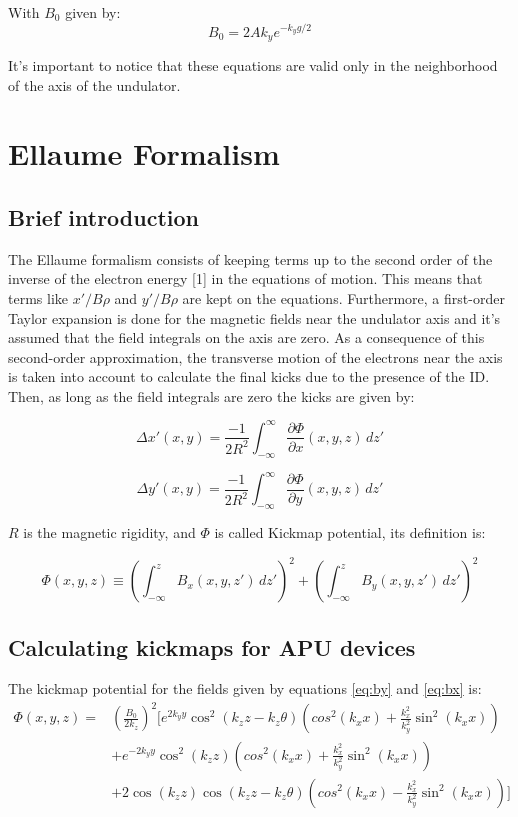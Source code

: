 \documentclass{article}
\begin{document}
With $B_0$ given by:
\begin{equation}
B_0 = 2Ak_ye^{-k_yg/2}
\end{equation}

It's important to notice that these equations are valid only in the neighborhood of the axis of the undulator.

\section{Ellaume Formalism}
\subsection{Brief introduction}
The Ellaume formalism consists of keeping terms up to the second order of the inverse of the electron energy [1] in the equations of motion. This means that terms like $x'/B\rho$ and $y'/B\rho$ are kept on the equations. Furthermore, a first-order Taylor expansion is done for the magnetic fields near the undulator axis and it's assumed that the field integrals on the axis are zero. As a consequence of this second-order approximation, the transverse motion of the electrons near the axis is taken into account to calculate the final kicks due to the presence of the ID. Then, as long as the field integrals are zero the kicks are given by:

\begin{equation}
\Delta x'(x,y) = \frac{-1}{2R^2}\int_{-\infty}^{\infty} \frac{\partial \Phi}{\partial x}(x,y,z) \,dz'
\end{equation}

\begin{equation}
\Delta y'(x,y) = \frac{-1}{2R^2}\int_{-\infty}^{\infty} \frac{\partial \Phi}{\partial y}(x,y,z) \,dz'
\end{equation}

$R$ is the magnetic rigidity, and $\Phi$ is called Kickmap potential, its definition is:

\begin{equation}
\Phi(x,y,z) \equiv \left(\int_{-\infty}^{z} B_x(x,y,z') \,dz'\right)^2 + \left(\int_{-\infty}^{z} B_y(x,y,z') \,dz'\right)^2
\end{equation}

\subsection{Calculating kickmaps for APU devices}
 The kickmap potential for the fields given by equations \ref{eq:by} and \ref{eq:bx} is:
\begin{equation}
    \begin{split}
        \Phi(x,y,z) = & \left(\frac{B_0}{2k_z}\right)^2\bigg[e^{2k_yy}\cos^2(k_zz-k_z\theta)\left(cos^2(k_xx)+\frac{k_x^2}{k_y^2}\sin^2(k_xx)\right) \\
        & + e^{-2k_yy}\cos^2(k_zz)\left(cos^2(k_xx)+\frac{k_x^2}{k_y^2}\sin^2(k_xx)\right) \\
        & + 2\cos(k_zz)\cos(k_zz - k_z\theta)\left(cos^2(k_xx)-\frac{k_x^2}{k_y^2}\sin^2(k_xx)\right)\bigg]
    \end{split}
\end{equation}
\end{document}
